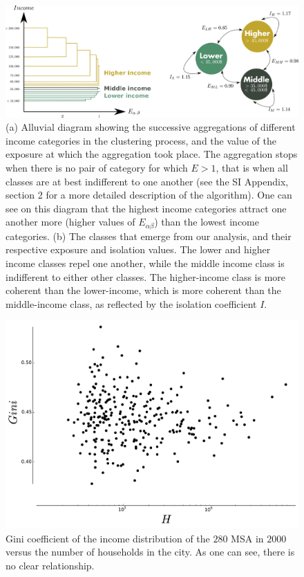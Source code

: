 \begin{figure}
    \includegraphics[width=\textwidth]{./gfx/chapter-segregation/figure1.pdf}
    \caption{(a) Alluvial diagram showing the successive aggregations
      of different income categories in the clustering process, and
      the value of the exposure at which the aggregation took
      place. The aggregation stops when there is no pair of category
      for which $E>1$, that is when all classes are at best
      indifferent to one another (see the SI Appendix, section 2 for a more
      detailed description of the algorithm). One can see on this diagram that
      the highest income categories attract one another more (higher values of
      $E_{\alpha \beta}$) than the lowest income categories. (b) The classes that emerge from our
      analysis, and their respective exposure and isolation values. The lower
      and higher income classes repel one another, while the middle
      income class is indifferent to either other classes.  The
      higher-income class is more coherent than the lower-income,
      which is more coherent than the middle-income class, as
      reflected by the isolation coefficient $I$.}
\label{fig:classes_alluvial}
\end{figure}


\begin{figure}[!h]
    \centering
    \includegraphics[width=\textwidth]{./gfx/chapter-segregation/gini_income.pdf}
    \caption{Gini coefficient of the income distribution of the $280$ MSA in
    $2000$ versus the number of households in the city. As one can see, there is
no clear relationship.\label{fig:gini}}
\end{figure}

